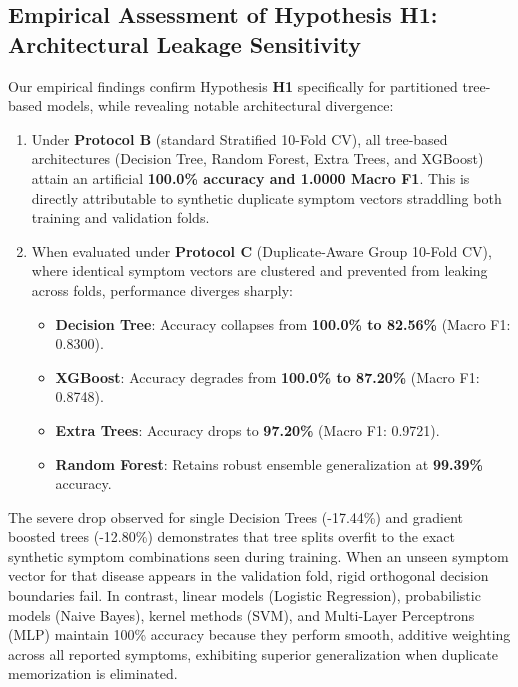\subsection{Empirical Assessment of Hypothesis H1: Architectural Leakage Sensitivity}
Our empirical findings confirm Hypothesis \textbf{H1} specifically for partitioned tree-based models, while revealing notable architectural divergence:
\begin{enumerate}
    \item Under \textbf{Protocol B} (standard Stratified 10-Fold CV), all tree-based architectures (Decision Tree, Random Forest, Extra Trees, and XGBoost) attain an artificial \textbf{100.0\% accuracy and 1.0000 Macro F1}. This is directly attributable to synthetic duplicate symptom vectors straddling both training and validation folds.
    \item When evaluated under \textbf{Protocol C} (Duplicate-Aware Group 10-Fold CV), where identical symptom vectors are clustered and prevented from leaking across folds, performance diverges sharply:
    \begin{itemize}
        \item \textbf{Decision Tree}: Accuracy collapses from \textbf{100.0\% to 82.56\%} (Macro F1: 0.8300).
        \item \textbf{XGBoost}: Accuracy degrades from \textbf{100.0\% to 87.20\%} (Macro F1: 0.8748).
        \item \textbf{Extra Trees}: Accuracy drops to \textbf{97.20\%} (Macro F1: 0.9721).
        \item \textbf{Random Forest}: Retains robust ensemble generalization at \textbf{99.39\%} accuracy.
    \end{itemize}
\end{enumerate}

The severe drop observed for single Decision Trees (-17.44\%) and gradient boosted trees (-12.80\%) demonstrates that tree splits overfit to the exact synthetic symptom combinations seen during training. When an unseen symptom vector for that disease appears in the validation fold, rigid orthogonal decision boundaries fail. In contrast, linear models (Logistic Regression), probabilistic models (Naive Bayes), kernel methods (SVM), and Multi-Layer Perceptrons (MLP) maintain 100\% accuracy because they perform smooth, additive weighting across all reported symptoms, exhibiting superior generalization when duplicate memorization is eliminated.

